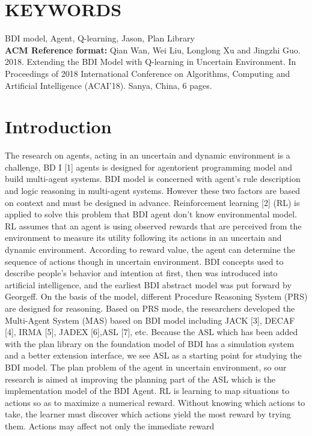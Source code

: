 \documentclass{article}
\begin{document}
\section*{KEYWORDS}
BDI model, Agent, Q-learning, Jason, Plan Library\\
\textbf{ACM Reference format:}
Qian Wan, Wei Liu, Longlong Xu and Jingzhi Guo. 2018. Extending the
BDI Model with Q-learning in Uncertain Environment. In Proceedings of
2018 International Conference on Algorithms, Computing and Artificial
Intelligence (ACAI’18). Sanya, China, 6 pages.


\section{Introduction}
The research on agents, acting in an uncertain and dynamic
environment is a challenge, BD I [1] agents is designed for agentorient programming model and build multi-agent systems. BDI
model is concerned with agent’s rule description and logic
reasoning in multi-agent systems. However these two factors are
based on context and must be designed in advance.
Reinforcement learning [2] (RL) is applied to solve this problem
that BDI agent don’t know environmental model. RL assumes
that an agent is using observed rewards that are perceived from
the environment to measure its utility following its actions in an
uncertain and dynamic environment. According to reward value,
the agent can determine the sequence of actions though in
uncertain environment.
BDI concepts used to describe people's behavior and intention
at first, then was introduced into artificial intelligence, and the
earliest BDI abstract model was put forward by Georgeff. On
the basis of the model, different Procedure Reasoning System
(PRS) are designed for reasoning. Based on PRS mode, the
researchers developed the Multi-Agent System (MAS) based on
BDI model including JACK [3], DECAF [4], IRMA [5],
JADEX [6],ASL [7], etc. Because the ASL which has been
added with the plan library on the foundation model of BDI has
a simulation system and a better extension interface, we see
ASL as a starting point for studying the BDI model. The plan
problem of the agent in uncertain environment, so our research
is aimed at improving the planning part of the ASL which is the
implementation model of the BDI Agent.
RL is learning to map situations to actions so as to maximize
a numerical reward. Without knowing which actions to take, the
learner must discover which actions yield the most reward by
trying them. Actions may affect not only the immediate reward
\end{document}
